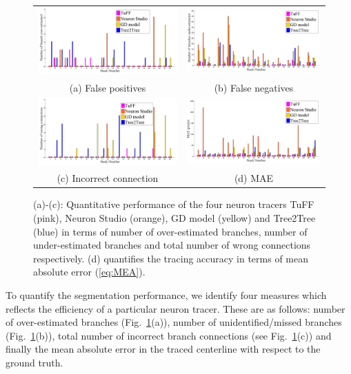 \begin{figure}[b]
\renewcommand{\tabcolsep}{0.05cm}
\begin{tabular}{cc}
	\includegraphics[width=.48\linewidth]{./images/TuFF/FP}
	&\includegraphics[width=.48\linewidth]{./images/TuFF/FN}
	\\
	\scriptsize (a) False positives & \scriptsize (b) False negatives
	\\
	\includegraphics[width=.48\linewidth]{./images/TuFF/wrong}
	&\includegraphics[width=.48\linewidth]{./images/TuFF/MAE} \\
	\scriptsize (c) Incorrect connection & \scriptsize (d) MAE
\end{tabular}
\caption[Quantitative performance comparison]{(a)-(c): Quantitative performance of the four neuron tracers TuFF (pink), Neuron Studio (orange), GD model \cite{peng_GAD} (yellow) and Tree2Tree (blue) in terms of number of over-estimated branches, number of under-estimated branches and total number of wrong connections respectively. (d) quantifies the tracing accuracy in terms of mean absolute error (\ref{eq:MEA}).}
\label{fig:graph_plots}
\vspace{-0.2in}
\end{figure}
To quantify the segmentation performance, we identify four measures which reflects the efficiency of a particular neuron tracer. These are as follows: number of over-estimated branches (Fig.~\ref{fig:graph_plots}(a)), number of unidentified/missed branches (Fig.~\ref{fig:graph_plots}(b)), total number of incorrect branch connections (see Fig.~\ref{fig:graph_plots}(c)) and finally the mean absolute error in the traced centerline with respect to the ground truth.

